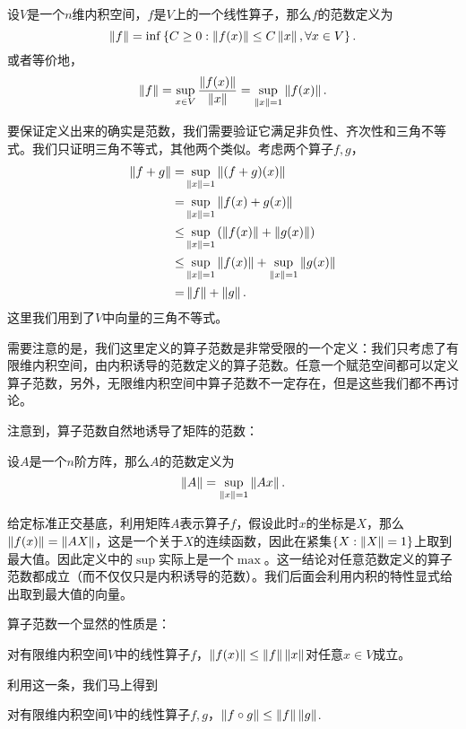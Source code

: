 \begin{definition}[算子范数]
    设$V$是一个$n$维内积空间，$f$是$V$上的一个线性算子，那么$f$的范数定义为
    \[\left\|f\right\|=\inf\left\{C\geq 0:\left\|f(x)\right\|\leq C\left\|x\right\|,\forall x\in V\right\}.\]
或者等价地，
\[\left\|f\right\|=\sup_{x\in V}\frac{\left\|f(x)\right\|}{\left\|x\right\|}=\sup_{\left\|x\right\|=1}\left\|f(x)\right\|.\]
\end{definition}
要保证定义出来的确实是范数，我们需要验证它满足非负性、齐次性和三角不等式。我们只证明三角不等式，其他两个类似。考虑两个算子$f,g$，
\begin{align*}
    \left\|f+g\right\|=&\sup_{\left\|x\right\|=1}\left\|(f+g)(x)\right\|\\
    =&\sup_{\left\|x\right\|=1}\left\|f(x)+g(x)\right\|\\
    \leq&\sup_{\left\|x\right\|=1}\left(\left\|f(x)\right\|+\left\|g(x)\right\|\right)\\
    \leq&\sup_{\left\|x\right\|=1}\left\|f(x)\right\|+\sup_{\left\|x\right\|=1}\left\|g(x)\right\|\\
    =&\left\|f\right\|+\left\|g\right\|.
\end{align*}
这里我们用到了$V$中向量的三角不等式。

需要注意的是，我们这里定义的算子范数是非常受限的一个定义：我们只考虑了有限维内积空间，由内积诱导的范数定义的算子范数。任意一个赋范空间都可以定义算子范数，另外，无限维内积空间中算子范数不一定存在，但是这些我们都不再讨论。

注意到，算子范数自然地诱导了矩阵的范数：
\begin{definition}[矩阵范数]
    设$A$是一个$n$阶方阵，那么$A$的范数定义为
    \[\left\|A\right\|=\sup_{\left\|x\right\|=1}\left\|Ax\right\|.\]
\end{definition}

给定标准正交基底，利用矩阵$A$表示算子$f$，假设此时$x$的坐标是$X$，那么$\left\|f(x)\right\|=\left\|AX\right\|$，这是一个关于$X$的连续函数，因此在紧集$\{X:\left\|X\right\|=1\}$上取到最大值。因此定义中的$\sup$实际上是一个$\max$。这一结论对任意范数定义的算子范数都成立（而不仅仅只是内积诱导的范数）。我们后面会利用内积的特性显式给出取到最大值的向量。

算子范数一个显然的性质是：

\begin{proposition}\label{prop:norm-ineq}
对有限维内积空间$V$中的线性算子$f$，$\left\|f(x)\right\|\leq \left\|f\right\|\left\|x\right\|$对任意$x\in V$成立。
\end{proposition}

利用这一条，我们马上得到

\begin{proposition}\label{prop:operator-norm-ineq}
对有限维内积空间$V$中的线性算子$f,g$，$\left\|f\circ g\right\|\leq \left\|f\right\|\left\|g\right\|$.
\end{proposition}

